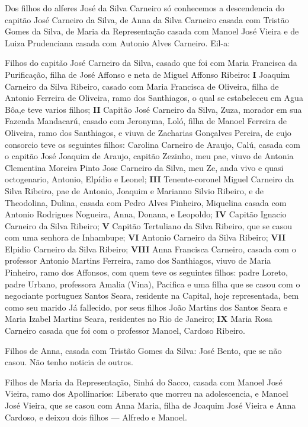 Dos filhos do alferes José da Silva Carneiro só conhecemos a descendencia do capitão José Carneiro da Silva, de Anna da Silva Carneiro casada com Tristão Gomes da Silva, de Maria da Representação casada com Manoel José Vieira e de Luiza Prudenciana casada com Autonio Alves Carneiro. Eil-a: 

Filhos do capitão José Carneiro da Silva, casado que foi com Maria Francisca da Purificação, filha de José Affonso e neta de Miguel Affonso Ribeiro: \textbf{I} Joaquim Carneiro da Silva Ribeiro, casado com Maria Francisca de Oliveira, filha de Antonio Ferreira de Oliveira, ramo dos Santhiagos, o qual se estabeleceu em Agua Bôa,e teve varios filhos; \textbf{II} Capitão José Carneiro da Silva, Zuza, morador em sua Fazenda Mandacarú, casado com Jeronyma, Loló, filha de Manoel Ferreira de Oliveira, ramo dos Santhiagos, e viuva de Zacharias Gonçalves Pereira, de cujo consorcio teve os seguintes filhos: Carolina Carneiro de Araujo, Calú, casada com o capitão José Joaquim de Araujo, capitão Zezinho, meu pae, viuvo de Antonia Clementina Moreira Pinto Jose Carneiro da Silva, meu Ze, anda vivo e quasi octogenario, Antonio, Elpídio e Leonel; \textbf{III} Tenente-coronel Miguel Carneiro da Silva Ribeiro, pae de Antonio, Joaquim e Marianno Silvio Ribeiro, e de Theodolina, Dulina, casada com Pedro Alves Pinheiro, Miquelina casada com Antonio Rodrigues Nogueira, Anna, Donana, e Leopoldo; \textbf{IV} Capitão Ignacio Carneiro da Silva Ribeiro; \textbf{V} Capitão Tertuliano da Silva Ribeiro, que se casou com uma senhora de Inhambupe; \textbf{VI} Antonio Carneiro da Silva Ribeiro; \textbf{VII} Elpidio Carneiro da Silva Ribeiro; \textbf{VIII} Anna Francisca Carneiro, casada com o professor Antonio Martins Ferreira, ramo dos Santhiagos, viuvo de Maria Pinheiro, ramo dos Affonsos, com quem teve os seguintes filhos: padre Loreto, padre Urbano, professora Amalia (Vina), Pacifica e uma filha que se casou com o negociante portuguez Santos Seara, residente na Capital, hoje representada, bem como seu marido Já fallecido, por seus filhos João Martins dos Santos Seara e Maria Izabel Martins Seara, residentes no Rio de Janeiro; \textbf{IX} Maria Rosa Carneiro casada que foi com o professor Manoel, Cardoso Ribeiro.

Filhos de Anna, casada com Tristão Gomes da Silva: José Bento, que se não casou. Não tenho noticia de outros.

Filhos de Maria da Representação, Sinhá do Sacco, casada com Manoel José Vieira, ramo dos Apollinarios: Liberato que morreu na adolescencia, e Manoel José Vieira, que se casou com Anna Maria, filha de Joaquim José Vieira e Anna
Cardoso, e deixou dois filhos — Alfredo e Manoel.

